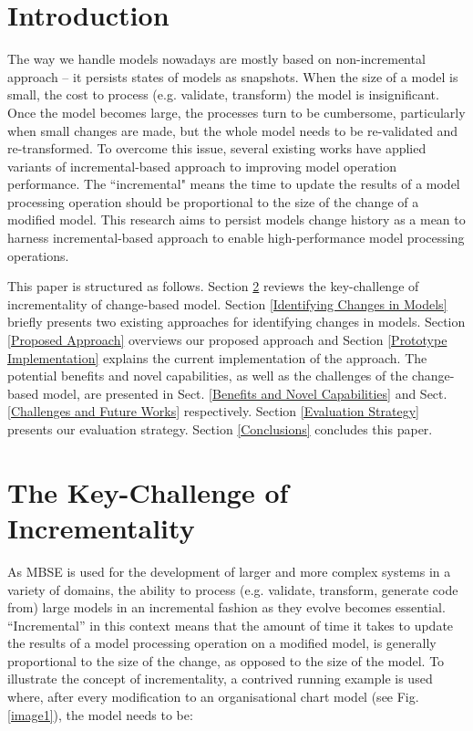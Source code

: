 \documentclass{llncs}
\begin{document}
\section{Introduction}
\label{Introduction}
The way we handle models nowadays are mostly based on non-incremental approach -- it persists states of models as snapshots. When the size of a model is small, the cost to process (e.g. validate, transform) the model is insignificant. Once the model becomes large, the processes turn to be cumbersome, particularly when small changes are made, but the whole model needs to be re-validated and re-transformed. To overcome this issue, several existing works \cite{egyed2011automatically, jouault2010towards, rath2012derived, ogunyomi2015property} have applied variants of incremental-based approach to improving model operation performance. The ``incremental" means the time to update the results of a model processing operation should be proportional to the size of the change of a modified model. This research aims to persist models change history as a mean to harness incremental-based approach to enable high-performance model processing operations.

This paper is structured as follows. Section \ref{The Key-Challenge of Incrementality} reviews the key-challenge of incrementality of change-based model. Section \ref{Identifying Changes in Models} briefly presents two existing approaches for identifying changes in models. Section \ref{Proposed Approach} overviews our proposed approach and Section \ref{Prototype Implementation} explains the current implementation of the approach. The potential benefits and novel capabilities, as well as the challenges of the change-based model, are presented in Sect. \ref{Benefits and Novel Capabilities} and Sect. \ref{Challenges and Future Works} respectively. Section \ref{Evaluation Strategy} presents our evaluation strategy. Section \ref{Conclusions} concludes this paper.

\section{The Key-Challenge of Incrementality}
\label{The Key-Challenge of Incrementality}
As MBSE is used for the development of larger and more complex systems in a variety of domains, the ability to process (e.g. validate, transform, generate code from) large models in an incremental fashion as they evolve becomes essential. ``Incremental'' in this context means that the amount of time it takes to update the results of a model processing operation on a modified model, is generally proportional to the size of the change, as opposed to the size of the model. To illustrate the concept of incrementality, a contrived running example is used where, after every modification to an organisational chart model (see Fig. \ref{image1}), the model needs to be:
\end{document}
